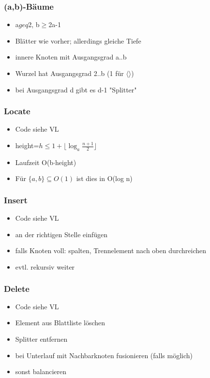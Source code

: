 \begin{frame}
\frametitle{(a,b)-Bäume}
\begin{itemize}
\item a$geq$2, b$\geq$2a-1
\item Blätter wie vorher; allerdings gleiche Tiefe
\item innere Knoten mit Ausgangsgrad a..b
\item Wurzel hat Ausgangsgrad 2..b (1 für $\langle\rangle$)\pause
\item bei Ausgangsgrad d gibt es d-1 "Splitter"
\end{itemize}
\end{frame}

\begin{frame}
\frametitle{Locate}
\begin{itemize}
\item Code siehe VL\pause
\item height=$h\leq 1+\lfloor\log_a\frac{n+1}{2}\rfloor$
\item Laufzeit O(b$\cdot$height)
\item Für $\{a,b\}\subseteq O(1)$ ist dies in O(log n)
\end{itemize}
\end{frame}

\begin{frame}
\frametitle{Insert}
\begin{itemize}
\item Code siehe VL
\item an der richtigen Stelle einfügen\pause
\item falls Knoten voll: spalten, Trennelement nach oben durchreichen
\item evtl. rekursiv weiter
\end{itemize}
\end{frame}

\begin{frame}
\frametitle{Delete}
\begin{itemize}
\item Code siehe VL
\item Element aus Blattliste löschen
\item Splitter entfernen\pause
\item bei Unterlauf mit Nachbarknoten fusionieren (falls möglich)\pause
\item sonst balancieren
\end{itemize}
\end{frame}
